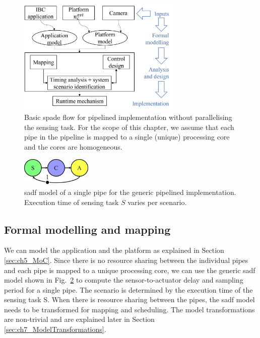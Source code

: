 \begin{figure}[t]
\centerline{
    \includegraphics[width=0.7\textwidth]{images/Pipelined_SPADe.jpg}
    }
    \caption{Basic \gls{spade} flow for pipelined implementation without parallelising the sensing task. For the scope of this chapter, we assume that each pipe in the pipeline is mapped to a single (unique) processing core and the cores are homogeneous.}
    \label{fig:ch6_spade}
    \vspace{-1em}
\end{figure}
\begin{figure}[h]
\centerline{
    \includegraphics[width=0.3\textwidth]{images/pipe_sadf.jpg}
    }
    \caption{\Gls{sadf} model of a single pipe for the generic pipelined implementation. Execution time of sensing task $S$ varies per scenario.}
    \label{fig:ch6_pipe_sadf}
    \vspace{-3em}
\end{figure}
\subsection{Formal modelling and mapping}
We can model the application and the platform as explained in Section \ref{sec:ch5_MoC}.
Since there is no resource sharing between the individual pipes and each pipe is mapped to a unique processing core, we can use the generic \gls{sadf} model shown in Fig.\ \ref{fig:ch6_pipe_sadf} to compute the sensor-to-actuator delay and sampling period for a single pipe. The scenario is determined by the execution time of the sensing task S. 
When there is resource sharing between the pipes, the \gls{sadf}  model needs to be transformed for mapping and scheduling.
The model transformations are non-trivial and are explained later in Section \ref{sec:ch7_ModelTransformations}. 

